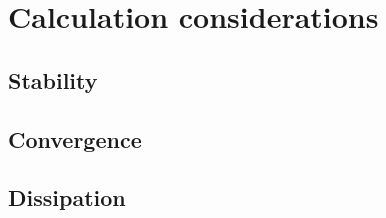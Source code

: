 \section{Calculation considerations}

\subsection{Stability}

\subsection{Convergence}

\subsection{Dissipation}